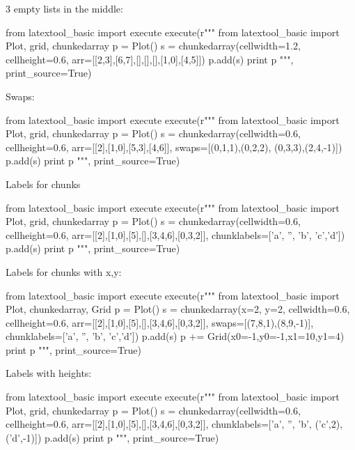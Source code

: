 3 empty lists in the middle:
\begin{python}
from latextool_basic import execute
execute(r"""
from latextool_basic import Plot, grid, chunkedarray
p = Plot()
s = chunkedarray(cellwidth=1.2,
                 cellheight=0.6,
                 arr=[[2,3],[6,7],[],[],[],[1,0],[4,5]])
p.add(s)
print p
""", print_source=True)
\end{python}





Swaps:
\begin{python}
from latextool_basic import execute
execute(r"""
from latextool_basic import Plot, grid, chunkedarray
p = Plot()
s = chunkedarray(cellwidth=0.6,
                 cellheight=0.6,
                 arr=[[2],[1,0],[5,3],[4,6]],
                 swaps=[(0,1,1),(0,2,2), (0,3,3),(2,4,-1)])
p.add(s)
print p
""", print_source=True)
\end{python}




\newpage
Labels for chunks
\begin{python}
from latextool_basic import execute
execute(r"""
from latextool_basic import Plot, grid, chunkedarray
p = Plot()
s = chunkedarray(cellwidth=0.6,
                 cellheight=0.6,
                 arr=[[2],[1,0],[5],[],[3,4,6],[0,3,2]],
                 chunklabels=['a', '', 'b', 'c','d'])
p.add(s)
print p
""", print_source=True)
\end{python}

Labels for chunks with x,y:
\begin{python}
from latextool_basic import execute
execute(r"""
from latextool_basic import Plot, chunkedarray, Grid
p = Plot()
s = chunkedarray(x=2, y=2,
                 cellwidth=0.6,
                 cellheight=0.6,
                 arr=[[2],[1,0],[5],[],[3,4,6],[0,3,2]],
                 swaps=[(7,8,1),(8,9,-1)],
                 chunklabels=['a', '', 'b', 'c','d'])
p.add(s)
p += Grid(x0=-1,y0=-1,x1=10,y1=4)
print p
""", print_source=True)
\end{python}




Labels with heights:
\begin{python}
from latextool_basic import execute
execute(r"""
from latextool_basic import Plot, grid, chunkedarray
p = Plot()
s = chunkedarray(cellwidth=0.6,
                 cellheight=0.6,
                 arr=[[2],[1,0],[5],[],[3,4,6],[0,3,2]],
                 chunklabels=['a', '', 'b', ('c',2),('d',-1)])
p.add(s)
print p
""", print_source=True)
\end{python}




